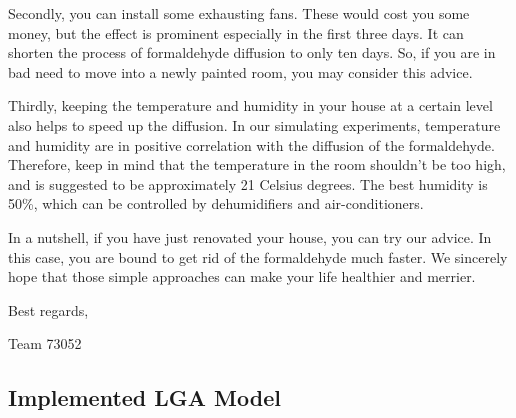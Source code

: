 \documentclass{mcmthesis}
\begin{document}
Secondly, you can install some exhausting fans. These would cost you some money, but the effect is prominent especially in the first three days. It can shorten the process of formaldehyde diffusion to only ten days. So, if you are in bad need to move into a newly painted room, you may consider this advice.

Thirdly, keeping the temperature and humidity in your house at a certain level also helps to speed up the diffusion. In our simulating experiments, temperature and humidity are in positive correlation with the diffusion of the formaldehyde. Therefore, keep in mind that the temperature in the room shouldn't be too high, and is suggested to be approximately 21 Celsius degrees. The best humidity is 50\%, which can be controlled by dehumidifiers and air-conditioners.

In a nutshell, if you have just renovated your house, you can try our advice. In this case, you are bound to get rid of the formaldehyde much faster. We sincerely hope that those simple approaches can make your life healthier and merrier.

\begin{flushright}
Best regards,
                                     
Team 73052
\end{flushright}
	
\newpage

\begin{appendices}

\section{Implemented LGA Model}




\end{appendices}
\end{document}
